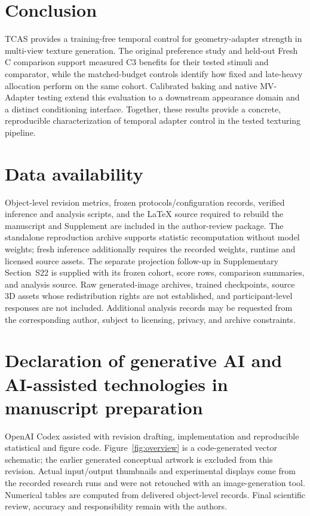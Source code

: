 \documentclass[times,twocolumn,final]{elsarticle}
\begin{document}
\section{Conclusion}
\label{sec:conclusion}
TCAS provides a training-free temporal control for geometry-adapter strength in multi-view texture generation. The original preference study and held-out Fresh C comparison support measured C3 benefits for their tested stimuli and comparator, while the matched-budget controls identify how fixed and late-heavy allocation perform on the same cohort. Calibrated baking and native MV-Adapter testing extend this evaluation to a downstream appearance domain and a distinct conditioning interface. Together, these results provide a concrete, reproducible characterization of temporal adapter control in the tested texturing pipeline.

\section*{Data availability}

Object-level revision metrics, frozen protocols/configuration records, verified inference and analysis scripts, and the LaTeX source required to rebuild the manuscript and Supplement are included in the author-review package. The standalone reproduction archive supports statistic recomputation without model weights; fresh inference additionally requires the recorded weights, runtime and licensed source assets. The separate projection follow-up in Supplementary Section~S22 is supplied with its frozen cohort, score rows, comparison summaries, and analysis source. Raw generated-image archives, trained checkpoints, source 3D assets whose redistribution rights are not established, and participant-level responses are not included. Additional analysis records may be requested from the corresponding author, subject to licensing, privacy, and archive constraints.

\section*{Declaration of generative AI and AI-assisted technologies in manuscript preparation}
OpenAI Codex assisted with revision drafting, implementation and reproducible statistical and figure code. Figure~\ref{fig:overview} is a code-generated vector schematic; the earlier generated conceptual artwork is excluded from this revision. Actual input/output thumbnails and experimental displays come from the recorded research runs and were not retouched with an image-generation tool. Numerical tables are computed from delivered object-level records. Final scientific review, accuracy and responsibility remain with the authors.
\end{document}
